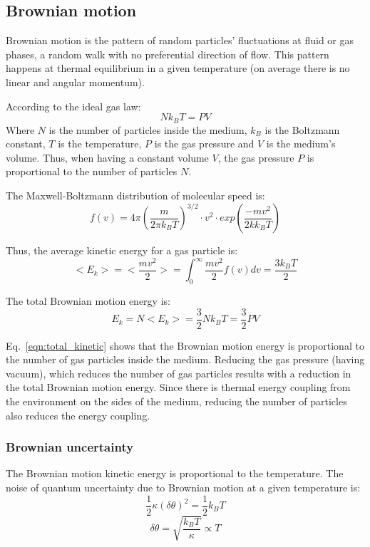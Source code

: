 \documentclass[\main/master.tex]{subfiles}
\begin{document}
\subsection{Brownian motion}
Brownian motion is the pattern of random particles' fluctuations at fluid or gas phases, a random walk with no preferential direction of flow. This pattern happens at thermal equilibrium in a given temperature (on average there is no linear and angular momentum). 
\par\noindent
According to the ideal gas law: 
\begin{equation}
N k_B T = PV  \label{eqn:ideal-gasses}
\end{equation}
Where $N$ is the number of particles inside the medium, $k_B$ is the Boltzmann constant, $T$ is the temperature, $P$ is the gas pressure and $V$ is the medium's volume. Thus, when having a constant volume $V$, the gas pressure $P$ is proportional to the number of particles $N$.
\par\noindent
The Maxwell-Boltzmann distribution of molecular speed is:
\begin{equation}
f(v) = 4\pi(\frac{m}{2 \pi k_B T})^{3/2}\cdot v^2\cdot exp(\frac{-mv^2}{2kk_BT})     \label{eqn:Maxwell_Boltzmann}
\end{equation} 
\par\noindent 
Thus, the average kinetic energy for a gas particle is: 
\begin{equation}
<E_k>=<\frac{mv^2}{2}> = \int_{0}^{\infty}\frac{mv^2}{2}f(v)dv =  \frac{3k_BT}{2}    \label{eqn:average kinetic}
\end{equation}
\par\noindent
The total Brownian motion energy is:
\begin{equation}
E_k = N<E_k> =\frac{3}{2}N k_B T = \frac{3}{2}PV    \label{eqn:total_kinetic}
\end{equation}
\par\noindent
Eq.~\ref{eqn:total_kinetic} shows that the Brownian motion energy is proportional to the number of gas particles inside the medium. Reducing the gas pressure (having vacuum), which reduces the number of gas particles results with a reduction in the total Brownian motion energy. Since there is thermal energy coupling from the environment on the sides of the medium, reducing the number of particles also reduces the energy coupling.
\subsubsection{Brownian uncertainty}
The Brownian motion kinetic energy is proportional to the temperature. The noise of quantum uncertainty due to Brownian motion at a given temperature is: 
\begin{equation}
\frac{1}{2}\kappa (\delta\theta)^2= \frac{1}{2}k_BT  \label{eqn:radiation force}
\end{equation}
\begin{equation}
\delta\theta = \sqrt{\frac{k_BT}{\kappa}}\propto{T}  \label{eqn:radiation force_2}
\end{equation}
\end{document}
